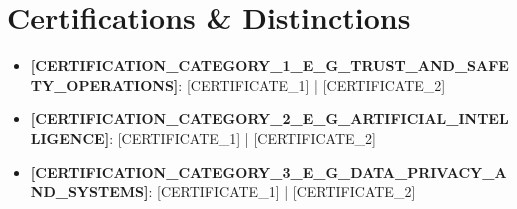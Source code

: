 ﻿%
\section{Certifications \& Distinctions}
\begin{itemize}[leftmargin=0.15in, label={}, itemsep=3pt]
  \small \item \textbf{[CERTIFICATION\_CATEGORY\_1\_E\_G\_TRUST\_AND\_SAFETY\_OPERATIONS]}{: [CERTIFICATE\_1] $ $|$ $ [CERTIFICATE\_2]}
  \small \item \textbf{[CERTIFICATION\_CATEGORY\_2\_E\_G\_ARTIFICIAL\_INTELLIGENCE]}{: [CERTIFICATE\_1] $ $|$ $ [CERTIFICATE\_2]}
  \small \item \textbf{[CERTIFICATION\_CATEGORY\_3\_E\_G\_DATA\_PRIVACY\_AND\_SYSTEMS]}{: [CERTIFICATE\_1] $ $|$ $ [CERTIFICATE\_2]}
\end{itemize}
